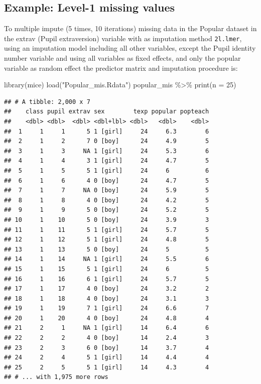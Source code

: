 \documentclass[
]{book}
\newenvironment{Shaded}{\begin{snugshade}}{\end{snugshade}}
\newcommand{\AttributeTok}[1]{\textcolor[rgb]{0.77,0.63,0.00}{#1}}
\newcommand{\DecValTok}[1]{\textcolor[rgb]{0.00,0.00,0.81}{#1}}
\newcommand{\FunctionTok}[1]{\textcolor[rgb]{0.00,0.00,0.00}{#1}}
\newcommand{\NormalTok}[1]{#1}
\newcommand{\SpecialCharTok}[1]{\textcolor[rgb]{0.00,0.00,0.00}{#1}}
\newcommand{\StringTok}[1]{\textcolor[rgb]{0.31,0.60,0.02}{#1}}
\begin{document}
\hypertarget{example-level-1-missing-values}{%
\subsection{Example: Level-1 missing values}\label{example-level-1-missing-values}}

To multiple impute (5 times, 10 iterations) missing data in the Popular dataset in the extrav (Pupil extraversion) variable with as imputation method \texttt{2l.lmer}, using an imputation model including all other variables, except the Pupil identity number variable and using all variables as fixed effects, and only the popular variable as random effect the predictor matrix and imputation procedure is:

\begin{Shaded}
\begin{Highlighting}[]
\FunctionTok{library}\NormalTok{(mice)}
\FunctionTok{load}\NormalTok{(}\StringTok{"Popular\_mis.Rdata"}\NormalTok{)}
\NormalTok{popular\_mis }\SpecialCharTok{\%\textgreater{}\%} \FunctionTok{print}\NormalTok{(}\AttributeTok{n =} \DecValTok{25}\NormalTok{)}
\end{Highlighting}
\end{Shaded}

\begin{verbatim}
## # A tibble: 2,000 x 7
##    class pupil extrav sex        texp popular popteach
##    <dbl> <dbl>  <dbl> <dbl+lbl> <dbl>   <dbl>    <dbl>
##  1     1     1      5 1 [girl]     24     6.3        6
##  2     1     2      7 0 [boy]      24     4.9        5
##  3     1     3     NA 1 [girl]     24     5.3        6
##  4     1     4      3 1 [girl]     24     4.7        5
##  5     1     5      5 1 [girl]     24     6          6
##  6     1     6      4 0 [boy]      24     4.7        5
##  7     1     7     NA 0 [boy]      24     5.9        5
##  8     1     8      4 0 [boy]      24     4.2        5
##  9     1     9      5 0 [boy]      24     5.2        5
## 10     1    10      5 0 [boy]      24     3.9        3
## 11     1    11      5 1 [girl]     24     5.7        5
## 12     1    12      5 1 [girl]     24     4.8        5
## 13     1    13      5 0 [boy]      24     5          5
## 14     1    14     NA 1 [girl]     24     5.5        6
## 15     1    15      5 1 [girl]     24     6          5
## 16     1    16      6 1 [girl]     24     5.7        5
## 17     1    17      4 0 [boy]      24     3.2        2
## 18     1    18      4 0 [boy]      24     3.1        3
## 19     1    19      7 1 [girl]     24     6.6        7
## 20     1    20      4 0 [boy]      24     4.8        4
## 21     2     1     NA 1 [girl]     14     6.4        6
## 22     2     2      4 0 [boy]      14     2.4        3
## 23     2     3      6 0 [boy]      14     3.7        4
## 24     2     4      5 1 [girl]     14     4.4        4
## 25     2     5      5 1 [girl]     14     4.3        4
## # ... with 1,975 more rows
\end{verbatim}
\end{document}
